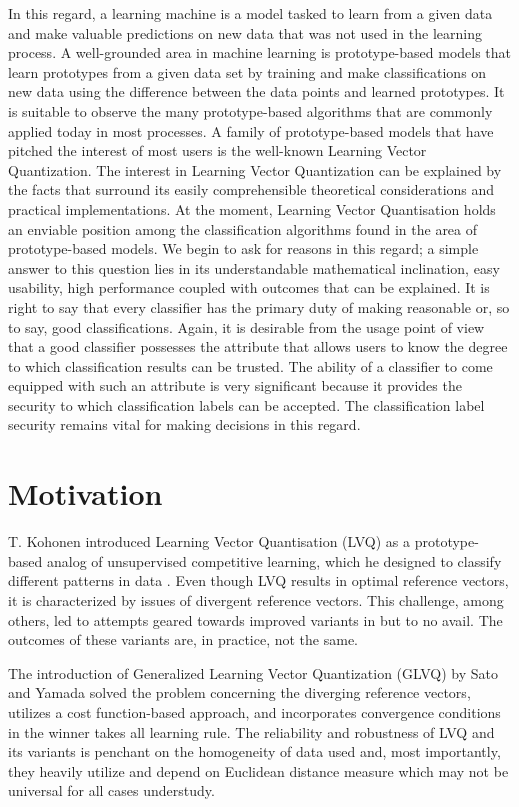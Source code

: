 \documentclass[english]{HSMW-Thesis}
\begin{document}
In this regard, a learning machine is a model tasked to learn from a given data and make valuable predictions on new data that was not used in the learning process. A well-grounded area in machine learning is prototype-based models that learn prototypes from a given data set by training and make classifications on new data using the difference between the data points and learned prototypes. It is suitable to observe the many prototype-based algorithms that are commonly applied today in most processes.  A family of prototype-based models that have pitched the interest of most users is the well-known Learning Vector Quantization. The interest in Learning Vector Quantization can be explained by the facts that surround its easily comprehensible theoretical considerations and practical implementations. At the moment, Learning Vector Quantisation holds an enviable position among the classification algorithms found in the area of prototype-based models.  We begin to ask for reasons in this regard; a simple answer to this question lies in its understandable mathematical inclination, easy usability, high performance coupled with outcomes that can be explained. It is right to say that every classifier has the primary duty of making reasonable or, so to say, good classifications. Again, it is desirable from the usage point of view that a good classifier possesses the attribute that allows users to know the degree to which classification results can be trusted. The ability of a classifier to come equipped with such an attribute is very significant because it provides the security to which classification labels can be accepted. The classification label security remains vital for making decisions in this regard.


\section{Motivation}
T. Kohonen introduced Learning Vector Quantisation (LVQ) as a prototype-based analog of unsupervised competitive learning, which he designed to classify different patterns in data \cite{kohonen2001learning}. Even though LVQ results in optimal reference vectors, it is characterized by issues of divergent reference vectors\cite{sato1996generalized}. This challenge, among others, led to attempts geared towards improved variants in \cite{kohonen2001learning} but to no avail. The outcomes of these variants are, in practice, not the same\cite{biehl2006learning}.


The introduction of Generalized Learning Vector Quantization (GLVQ) by Sato and Yamada solved the problem concerning the diverging reference vectors, utilizes a cost function-based approach, and incorporates convergence conditions in the winner takes all learning rule\cite{sato1996generalized}. The reliability and robustness of LVQ and its variants is penchant on the homogeneity of data used and, most importantly, they heavily utilize and depend on Euclidean distance measure which may not be universal for all cases understudy\cite{article}.
\end{document}
